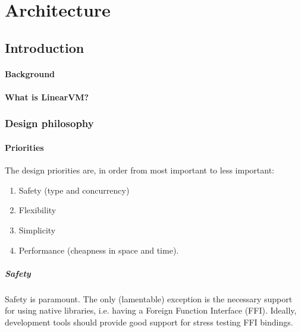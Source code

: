 \documentclass[a4paper]{book}
\begin{document}
\tableofcontents
\part{Architecture}

\chapter{Introduction}

\subsection{Background}


\subsection{What is LinearVM?}

\section{Design philosophy}

\subsection{Priorities}

The design priorities are, in order from most important to less important:

\begin{enumerate}
\item Safety (type and concurrency)
\item Flexibility
\item Simplicity
\item Performance (cheapness in space and time).
\end{enumerate}

\subsubsection*{Safety}
Safety is paramount. The only (lamentable) exception is the
necessary support for using native libraries, i.e. having a Foreign
Function Interface (FFI). Ideally, development tools should provide
good support for stress testing FFI bindings.
\end{document}
